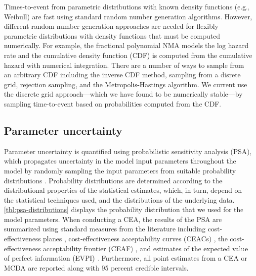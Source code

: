\documentclass[11pt,final,fleqn]{article}\usepackage[]{graphicx}\usepackage[]{color}
\theoremstyle{plain}
\begin{document}
Times-to-event from parametric distributions with known density functions (e.g., Weibull) are fast using standard random number generation algorithms. However, different random number generation approaches are needed for flexibly parametric distributions with density functions that must be computed numerically. For example, the fractional polynomial NMA models the log hazard rate and the cumulative density function (CDF) is computed from the cumulative hazard with numerical integration. There are a number of ways to sample from an arbitrary CDF including the inverse CDF method, sampling from a disrete grid, rejection sampling, and the Metropolis-Hastings algorithm. We current use the discrete grid approach---which we have found to be numerically stable---by sampling time-to-event based on probabilities computed from the CDF.

\subsection{Parameter uncertainty} \label{subsec:psa}
Parameter uncertainty is quantified using probabilistic sensitivity analysis (PSA), which propagates uncertainty in the model input parameters throughout the model by randomly sampling the input parameters from suitable probability distributions \citep{baio2015probabilistic, claxton2005probabilistic}. Probability distributions are determined according to the distributional properties of the statistical estimates, which, in turn, depend on the statistical techniques used, and the distributions of the underlying data. \autoref{tbl:psa-distributions} displays the probability distribution that we used for the model parameters. When conducting a CEA, the results of the PSA are summarized using standard measures from the literature including cost-effectiveness planes \citep{black1990plane, barton2008optimal}, cost-effectiveness acceptability curves (CEACs) \citep{van1994costs, briggs1999bayesian, fenwick2001representing, barton2008optimal}, the cost-effectiveness acceptability frontier (CEAF) \citep{barton2008optimal}, and estimates of the expected value of perfect information (EVPI) \citep{fenwick2001representing, barton2008optimal}. Furthermore, all point estimates from a CEA or MCDA are reported along with 95 percent credible intervals. 
\end{document}
